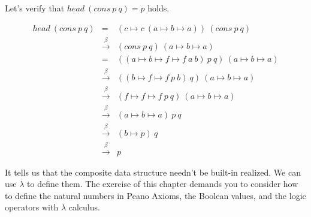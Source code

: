 \documentclass{article}
\begin{document}
Let's verify that $head\ (cons\ p\ q) = p$ holds.

\[
\begin{array}{rcl}
head\ (cons\ p\ q) & = & (c \mapsto c\ (a \mapsto b \mapsto a))\ (cons\ p\ q) \\
                   & \xrightarrow{\beta} & (cons\ p\ q)\ (a \mapsto b \mapsto a) \\
                   & = & ((a \mapsto b \mapsto f \mapsto f\ a\ b)\ p\ q)\ (a \mapsto b \mapsto a) \\
                   & \xrightarrow{\beta} & ((b \mapsto f \mapsto f\ p\ b)\ q)\ (a \mapsto b \mapsto a) \\
                   & \xrightarrow{\beta} & (f \mapsto f \mapsto f\ p\ q)\ (a \mapsto b \mapsto a) \\
                   & \xrightarrow{\beta} & (a \mapsto b \mapsto a)\ p\ q \\
                   & \xrightarrow{\beta} & (b \mapsto p)\ q \\
                   & \xrightarrow{\beta} & p
\end{array}
\]

It tells us that the composite data structure needn't be built-in realized. We can use $\lambda$ to define them. The exercise of this chapter demands you to consider how to define the natural numbers in Peano Axioms, the Boolean values, and the logic operators with $\lambda$ calculus.
\end{document}
